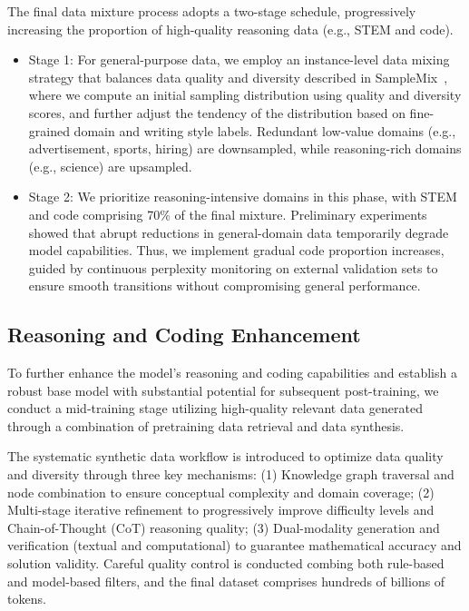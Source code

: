 \documentclass{article}
\begin{document}
The final data mixture process adopts a two-stage schedule, progressively increasing the proportion of high-quality reasoning data (e.g., STEM and code).

\begin{itemize}
    \item Stage 1: For general-purpose data, we employ an instance-level data mixing strategy that balances data quality and diversity described in SampleMix~\citep{samplemix}, where we compute an initial sampling distribution using quality and diversity scores, and further adjust the tendency of the distribution based on fine-grained domain and writing style labels. Redundant low-value domains (e.g., advertisement, sports, hiring) are downsampled, while reasoning-rich domains (e.g., science) are upsampled.

    
    \item Stage 2:  We prioritize reasoning-intensive domains in this phase, with STEM and code comprising 70\% of the final mixture. Preliminary experiments showed that abrupt reductions in general-domain data temporarily degrade model capabilities. Thus, we implement gradual code proportion increases, guided by continuous perplexity monitoring on external validation sets to ensure smooth transitions without compromising general performance.
\end{itemize}



\subsection{Reasoning and Coding Enhancement}
To further enhance the model's reasoning and coding capabilities and establish a robust base model with substantial potential for subsequent post-training, we conduct a mid-training stage utilizing high-quality relevant data generated through a combination of pretraining data retrieval and data synthesis.


The systematic synthetic data workflow is introduced to optimize data quality and diversity through three key mechanisms: (1) Knowledge graph traversal and node combination to ensure conceptual complexity and domain coverage; (2) Multi-stage iterative refinement to progressively improve difficulty levels and Chain-of-Thought (CoT) reasoning quality; (3) Dual-modality generation and verification (textual and computational) to guarantee mathematical accuracy and solution validity. 
Careful quality control is conducted combing both rule-based and model-based filters, and the final dataset comprises hundreds of billions of tokens.
\end{document}
